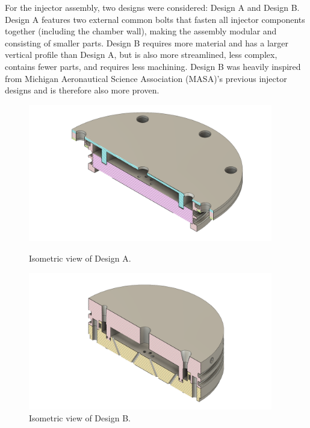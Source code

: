 \documentclass[9pt]{article} %
\numberwithin{equation}{section} %
\begin{document}
For the injector assembly, two designs were considered: Design A and Design B. Design A features two external common bolts that fasten all injector components together (including the chamber wall), making the assembly modular and consisting of smaller parts. Design B requires more material and has a larger vertical profile than Design A, but is also more streamlined, less complex, contains fewer parts, and requires less machining. Design B was heavily inspired from Michigan Aeronautical Science Association (MASA)'s previous injector designs and is therefore also more proven.

\begin{figure}
    \centering
    \begin{minipage}{0.495\textwidth}
        \centering
        \includegraphics[scale=0.5, width=0.95\textwidth, trim={4cm 1cm 4cm 1cm}, clip]{cad_files/Daniel Injector CAD.png} %
        \caption{Isometric view of Design A.}
        \label{fig:design_a}
    \end{minipage}\hfill
    \begin{minipage}{0.495\textwidth}
        \centering
        \includegraphics[scale=0.5, width=0.95\textwidth, trim={4cm 1cm 4cm 1cm}, clip]{cad_files/Final Injector Assembly ISO1.png} %
        \caption{Isometric view of Design B.}
        \label{fig:design_b}
    \end{minipage}
\end{figure} 
\end{document}
